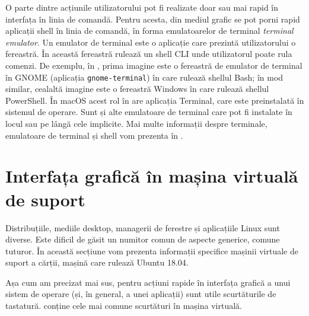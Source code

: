 O parte dintre acțiunile utilizatorului pot fi realizate doar sau mai rapid în interfața în linia de comandă.
Pentru acesta, din mediul grafic se pot porni rapid aplicații shell în linia de comandă, în forma emulatoarelor de terminal \textit{terminal emulator}.
Un emulator de terminal este o aplicație care prezintă utilizatorului o fereastră.
În această fereastră rulează un shell CLI unde utilizatorul poate rula comenzi.
De exemplu, în , prima imagine este o fereastră de emulator de terminal în GNOME (aplicația \texttt{gnome-terminal}) în care rulează shellul Bash;
în mod similar, cealaltă imagine este o fereastră Windows în care rulează shellul PowerShell.
În macOS acest rol în are aplicația Terminal, care este preinstalată în sistemul de operare.
Sunt și alte emulatoare de terminal care pot fi instalate în locul sau pe lângă cele implicite.
Mai multe informații despre terminale, emulatoare de terminal și shell vom prezenta în .

\section{Interfața grafică în mașina virtuală de suport}
\label{sec:ui:vm}

Distribuțiile, mediile desktop, managerii de ferestre și aplicațiile Linux sunt diverse.
Este dificil de găsit un numitor comun de aspecte generice, comune tuturor.
În această secțiune vom prezenta informații specifice mașinii virtuale de suport a cărții, mașină care rulează Ubuntu 18.04.

Așa cum am precizat mai sus, pentru acțiuni rapide în interfața grafică a unui sistem de operare (și, în general, a unei aplicații) sunt utile scurtăturile de tastatură.
 conține cele mai comune scurtături în mașina virtuală.

